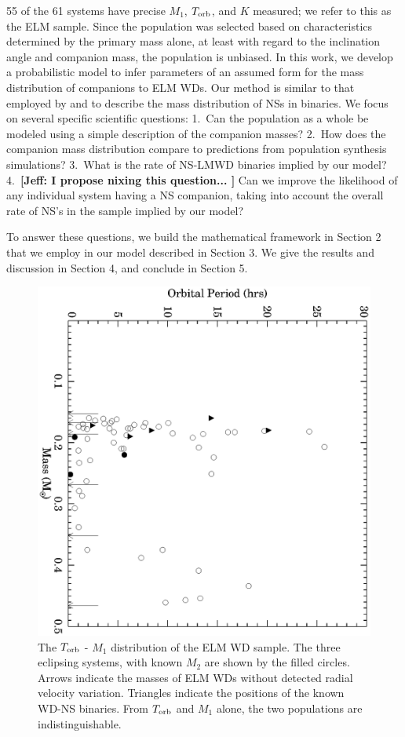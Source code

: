 \documentclass[letterpaper,12pt,preprint]{aastex}
\newcommand{\period}{T_{\rm orb}}
\begin{document}
55 of the 61 systems have precise $M_1$, $\period$, and $K$ measured; we refer to this as the ELM sample. Since the population was selected based on characteristics determined by the primary mass alone, at least with regard to the inclination angle and companion mass, the population is unbiased. In this work, we develop a probabilistic model to infer parameters of an assumed form for the mass distribution of companions to ELM WDs. Our method is similar to that employed by \citet{ozel12} and \citet{kiziltan13} to describe the mass distribution of NSs in binaries. We focus on several specific scientific questions: 1.\ Can the population as a whole be modeled using a simple description of the companion masses? 2.\ How does the companion mass distribution compare to predictions from population synthesis simulations?  3.\ What is the rate of NS-LMWD binaries implied by our model? 4.\ {\bf [Jeff: I propose nixing this question... ]} Can we improve the likelihood of any individual system having a NS companion, taking into account the overall rate of NS's in the sample implied by our model? 


To answer these questions, we build the mathematical framework in Section 2 that we employ in our model described in Section 3. We give the results and discussion in Section 4, and conclude in Section 5.

\begin{figure}[h!]
\begin{center}
\includegraphics[angle=90,width=0.95\columnwidth]{Porb_M1.eps}
\caption{The $\period$ - $M_1$ distribution of the ELM WD sample. The three eclipsing systems, with known $M_2$ are shown by the filled circles. Arrows indicate the masses of ELM WDs without detected radial velocity variation. Triangles indicate the positions of the known WD-NS binaries. From $\period$ and $M_1$ alone, the two populations are indistinguishable.}
\end{center}
\end{figure}
\end{document}
